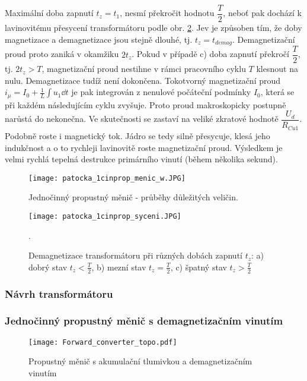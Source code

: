       Maximální doba zapnutí \(t_z=t_1\), nesmí překročit hodnotu \(\dfrac{T}{2}\), neboť pak 
      dochází k lavinovitému přesycení transformátoru podle obr. \ref{enz:fig_fey_1cinprop_syc}. Jev 
      je způsoben tím, že doby magnetizace a demagnetizace jsou stejně dlouhé, tj. 
      \(t_z=t_{demag}\). Demagnetizační proud proto zaniká v okamžiku \(2t_z\). Pokud v případě c) 
      doba zapnutí překročí \(\dfrac{T}{2}\), tj. \(2t_z > T\), magnetizační proud nestihne v rámci 
      pracovního cyklu \(T\) klesnout na nulu. Demagnetizace tudíž není dokončena. Tokotvorný 
      magnetizační proud \(i_\mu=I_0 + \frac{1}{L}\int{u_1\dd{t}}\) je pak integrován z nenulové 
      počáteční podmínky \(I_0\), která se při každém následujícím cyklu zvyšuje. Proto  proud 
      makroskopicky postupně narůstá do nekonečna. Ve skutečnosti se zastaví na veliké zkratové 
      hodnotě \(\dfrac{U_d}{R_{Cu1}}\). Podobně roste i magnetický tok. Jádro se tedy silně 
      přesycuje, klesá jeho indukčnost a o to rychleji lavinovitě roste magnetizační proud. 
      Výsledkem je velmi rychlá tepelná destrukce primárního vinutí (během několika sekund).      
  
      \begin{figure}
        \centering
        \texttt{[image: patocka\_1cinprop\_menic\_w.JPG]}
        \caption{Jednočinný propustný měnič - průběhy důležitých veličin.}
        \label{enz:fig_fey_1cinprop_mw} 
      \end{figure}
  
      \begin{figure}
        \texttt{[image: patocka\_1cinprop\_syceni.JPG]}
        \caption{Demagnetizace transformátoru při různých dobách zapnutí \(t_z\): a) dobrý stav 
                 \(t_z < \frac{T}{2}\), b) mezní stav \(t_z = \frac{T}{2}\), c) špatný stav \(t_z > 
                 \frac{T}{2}\)}.
        \label{enz:fig_fey_1cinprop_syc}
      \end{figure}
      
    \subsubsection{Návrh transformátoru}
    
    \subsubsection{Jednočinný propustný měnič s demagnetizačním vinutím}
      \begin{figure}[ht!]
        \centering
        \texttt{[image: Forward\_converter\_topo.pdf]}
        \caption[Propustný měnič s akumulační tlumivkou a demagnetizačním vinutím]{Propustný měnič
                 s akumulační tlumivkou  a demagnetizačním vinutím}
        \label{enz:fig_Forward_demag_topo}
      \end{figure}
      
